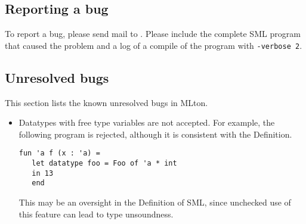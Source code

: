 
\subsection{Reporting a bug}

To report a bug, please send mail to {\mltonmail}.  Please include the
complete SML program that caused the problem and a log of a compile of
the program with {\tt -verbose 2}.

\subsection{Unresolved bugs}

This section lists the known unresolved bugs in MLton.

\begin{itemize}

\item
Datatypes with free type variables are not accepted.  For example,
the following program is rejected, although it is consistent with the
Definition.
\begin{verbatim}
fun 'a f (x : 'a) =
   let datatype foo = Foo of 'a * int
   in 13
   end
\end{verbatim}
This may be an oversight in the Definition of SML, since unchecked use
of this feature can lead to type unsoundness.

\end{itemize}
